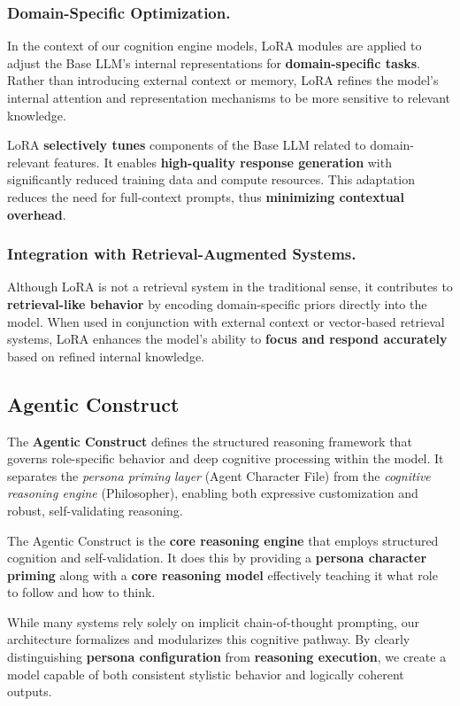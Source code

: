 \documentclass{article}
\begin{document}
\subsubsection{Domain-Specific Optimization.} In the context of our cognition engine models, LoRA modules are applied to adjust the Base LLM’s internal representations for \textbf{domain-specific tasks}. Rather than introducing external context or memory, LoRA refines the model’s internal attention and representation mechanisms to be more sensitive to relevant knowledge.

 LoRA \textbf{selectively tunes} components of the Base LLM related to domain-relevant features.  It enables \textbf{high-quality response generation} with significantly reduced training data and compute resources. This adaptation reduces the need for full-context prompts, thus \textbf{minimizing contextual overhead}.


\subsubsection{Integration with Retrieval-Augmented Systems.} Although LoRA is not a retrieval system in the traditional sense, it contributes to \textbf{retrieval-like behavior} by encoding domain-specific priors directly into the model. When used in conjunction with external context or vector-based retrieval systems, LoRA enhances the model’s ability to \textbf{focus and respond accurately} based on refined internal knowledge.

\subsection{Agentic Construct}
The \textbf{Agentic Construct} defines the structured reasoning framework that governs role-specific behavior and deep cognitive processing within the model. It separates the \emph{persona priming layer} (Agent Character File) from the \emph{cognitive reasoning engine} (Philosopher), enabling both expressive customization and robust, self-validating reasoning.

The Agentic Construct is the \textbf{core reasoning engine} that employs structured cognition and self-validation. It does this by providing a \textbf{persona character priming} along with a \textbf{core reasoning model} effectively teaching it what role to follow and how to think.

While many systems rely solely on implicit chain-of-thought prompting, our architecture formalizes and modularizes this cognitive pathway. By clearly distinguishing \textbf{persona configuration} from \textbf{reasoning execution}, we create a model capable of both consistent stylistic behavior and logically coherent outputs. 
\end{document}
